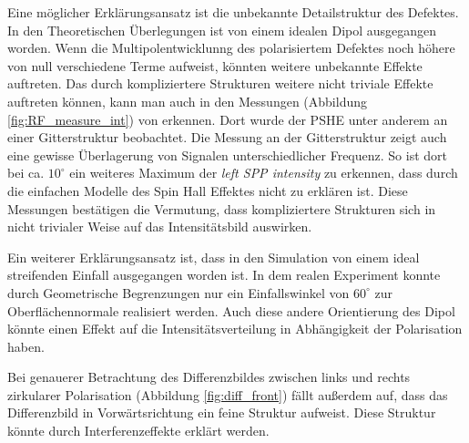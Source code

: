 \documentclass[titlepage]{article}
\begin{document}
	 Eine möglicher Erklärungsansatz ist die unbekannte Detailstruktur des Defektes. In den Theoretischen Überlegungen ist von einem idealen Dipol ausgegangen worden. Wenn die Multipolentwicklunng des polarisiertem Defektes noch höhere von null verschiedene Terme aufweist, könnten weitere unbekannte Effekte auftreten. Das durch kompliziertere Strukturen weitere nicht triviale Effekte auftreten können, kann man auch in den Messungen (Abbildung \ref{fig:RF_measure_int}) von \cite{RodriguezFortuno.2013} erkennen. Dort wurde der PSHE unter anderem an einer Gitterstruktur beobachtet. Die Messung an der Gitterstruktur zeigt auch eine gewisse Überlagerung von Signalen unterschiedlicher Frequenz. So ist dort bei ca. $10^\circ$ ein weiteres Maximum der \textit{left SPP intensity} zu erkennen, dass durch die einfachen Modelle des Spin Hall Effektes nicht zu erklären ist. Diese Messungen bestätigen die Vermutung, dass kompliziertere Strukturen sich in nicht trivialer Weise auf das Intensitätsbild auswirken.
	 
	 Ein weiterer Erklärungsansatz ist, dass in den Simulation von einem ideal streifenden Einfall ausgegangen worden ist. In dem realen Experiment konnte durch Geometrische Begrenzungen nur ein Einfallswinkel von $60^\circ$ zur Oberflächennormale realisiert werden. Auch diese andere Orientierung des Dipol könnte einen Effekt auf die Intensitätsverteilung in Abhängigkeit der Polarisation haben.
	 
	 Bei genauerer Betrachtung des Differenzbildes zwischen links und rechts zirkularer Polarisation (Abbildung \ref{fig:diff_front}) fällt außerdem auf, dass das Differenzbild in Vorwärtsrichtung ein feine Struktur aufweist. Diese Struktur könnte durch Interferenzeffekte erklärt werden.
\end{document}
